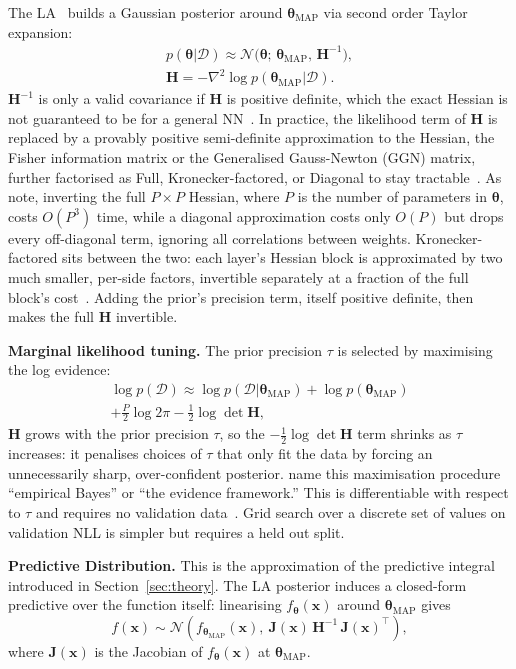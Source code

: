 \documentclass[conference]{IEEEtran}
\newcommand{\btheta}{\bm{\theta}}
\newcommand{\cD}{\mathcal{D}}
\newcommand{\cN}{\mathcal{N}}
\newcommand{\MAP}{\text{MAP}}
\begin{document}
The LA~\citep{daxberger2021laplace} builds a Gaussian posterior around $\btheta_{\MAP}$ via
second order Taylor expansion:
\begin{multline}
	p(\btheta|\cD) \approx \cN\!\bigl(\btheta;\,\btheta_{\MAP},\,\mathbf{H}^{-1}\bigr), \\
	\mathbf{H} = -\nabla^2\log p(\btheta_{\MAP}|\cD).
\end{multline}
$\mathbf{H}^{-1}$ is only a valid covariance if $\mathbf{H}$ is positive definite, which the
exact Hessian is not guaranteed to be for a general NN~\citep{daxberger2021laplace}. In
practice, the likelihood term of $\mathbf{H}$ is replaced by a provably positive
semi-definite approximation to the Hessian, the Fisher information matrix or the
Generalised Gauss-Newton (GGN) matrix, further factorised as Full, Kronecker-factored, or
Diagonal to stay tractable~\citep{daxberger2021laplace}. As \citet{murphy2023pml} note,
inverting the full $P\times P$ Hessian, where $P$ is the number of parameters in $\btheta$,
costs $O(P^3)$ time, while a diagonal approximation costs only $O(P)$ but drops every
off-diagonal term, ignoring all correlations between weights. Kronecker-factored sits
between the two: each layer's Hessian block is approximated by two much smaller, per-side
factors, invertible separately at a fraction of the full block's
cost~\citep{daxberger2021laplace}. Adding the prior's precision term, itself positive
definite, then makes the full $\mathbf{H}$ invertible.

\textbf{Marginal likelihood tuning.} The prior precision $\tau$ is selected by maximising
the log evidence:
\begin{multline}
	\log p(\cD)
	\approx \log p(\cD|\btheta_{\MAP})
	+ \log p(\btheta_{\MAP}) \\
	+ \tfrac{P}{2}\log 2\pi
	- \tfrac{1}{2}\log\det\mathbf{H},
	\label{eq:marglik}
\end{multline}
$\mathbf{H}$ grows with the prior precision $\tau$, so the $-\tfrac12\log\det\mathbf{H}$
term shrinks as $\tau$ increases: it penalises choices of $\tau$ that only fit the data by
forcing an unnecessarily sharp, over-confident posterior. \citet{daxberger2021laplace} name
this maximisation procedure ``empirical Bayes'' or ``the evidence framework.'' This is
differentiable with respect to $\tau$ and requires no validation
data~\citep{daxberger2021laplace}. Grid search over a discrete set of values on validation
NLL is simpler but requires a held out split.

\textbf{Predictive Distribution.} This is the approximation of the predictive integral
introduced in Section~\ref{sec:theory}. The LA posterior induces a closed-form predictive
over the function itself: linearising $f_{\btheta}(\bm{x})$ around $\btheta_{\MAP}$ gives
\begin{equation}
	f(\bm{x}) \sim \cN\!\left(f_{\btheta_{\MAP}}(\bm{x}),\ \mathbf{J}(\bm{x})\,\mathbf{H}^{-1}\,\mathbf{J}(\bm{x})^\top\right),
	\label{eq:glm_predictive}
\end{equation}
where $\mathbf{J}(\bm{x})$ is the Jacobian of $f_{\btheta}(\bm{x})$ at $\btheta_{\MAP}$.
\end{document}
